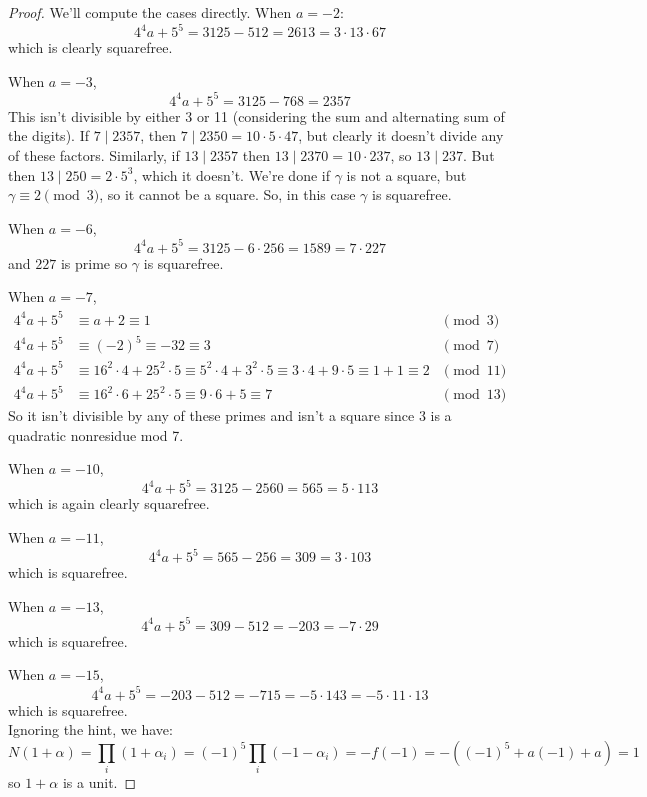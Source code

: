 \begin{proof}
    We'll compute the cases directly. When $a=-2$:
    \[ 4^4a + 5^5 = 3125 - 512 = 2613 = 3 \cdot 13 \cdot 67 \]
    which is clearly squarefree.

    When $a=-3$,
    \[ 4^4a + 5^5 = 3125 - 768 = 2357 \]
    This isn't divisible by either 3 or 11 (considering the sum and alternating sum of the digits). If $7 \mid 2357$, then $7 \mid 2350 = 10 \cdot 5 \cdot 47$, but clearly it doesn't divide any of these factors. Similarly, if $13 \mid 2357$ then $13 \mid 2370 = 10 \cdot 237$, so $13 \mid 237$. But then $13 \mid 250 = 2 \cdot 5^3$, which it doesn't. We're done if $\gamma$ is not a square, but $\gamma \equiv 2 \pmod{3}$, so it cannot be a square. So, in this case $\gamma$ is squarefree.

    When $a=-6$,
    \[ 4^4a + 5^5 = 3125 - 6 \cdot 256 = 1589 = 7 \cdot 227 \]
    and $227$ is prime so $\gamma$ is squarefree.

    When $a=-7$,
    \begin{align*}
    4^4a+5^5 &\equiv a+2 \equiv 1 & \pmod{3} \\
    4^4a+5^5 &\equiv (-2)^5 \equiv -32 \equiv 3 & \pmod{7} \\
    4^4a+5^5 &\equiv 16^2 \cdot 4 + 25^2 \cdot 5 \equiv 5^2 \cdot 4 + 3^2 \cdot 5 \equiv 3 \cdot 4 + 9 \cdot 5 \equiv 1+1 \equiv 2 & \pmod{11} \\
    4^4a+5^5 &\equiv 16^2 \cdot 6 + 25^2 \cdot 5 \equiv 9 \cdot 6 + 5 \equiv 7 & \pmod{13}
    \end{align*}
    So it isn't divisible by any of these primes and isn't a square since 3 is a quadratic nonresidue mod 7.

    When $a=-10$,
    \[ 4^4a+5^5 = 3125 - 2560 = 565 = 5 \cdot 113 \]
    which is again clearly squarefree.

    When $a=-11$,
    \[ 4^4a+5^5 = 565 - 256 = 309 = 3 \cdot 103 \]
    which is squarefree.

    When $a=-13$,
    \[ 4^4a+5^5 = 309 - 512 = -203 = -7 \cdot 29 \]
    which is squarefree.

    When $a=-15$,
    \[ 4^4a+5^5 = -203 - 512 = -715 = -5 \cdot 143 = -5 \cdot 11 \cdot 13 \]
    which is squarefree. \\

    Ignoring the hint, we have:
    \[ N(1+\alpha) = \prod_i (1+\alpha_i) = (-1)^5\prod_i (-1-\alpha_i) = -f(-1) = -((-1)^5+a(-1)+a) = 1 \]
    so $1+\alpha$ is a unit.
\end{proof}
